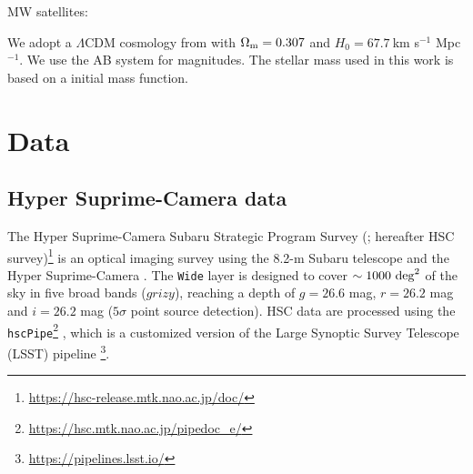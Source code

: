 \documentclass[twocolumn,astrosymb,twocolappendix]{aastex631}
\newcommand{\code}[1]{\texttt{#1}}
\begin{document}
\begin{CJK*}{UTF8}{gbsn}

MW satellites: \citep{Nashimoto2022}


We adopt a $\Lambda$CDM cosmology from \citet{Planck15} with $\Omega_{\rm m}= 0.307$ and $H_0 = 67.7\ $km s$^{-1}$ Mpc$^{-1}$. We use the AB system \citep{Oke1983} for magnitudes. The stellar mass used in this work is based on a \citet{Chabrier2003} initial mass function.

\section{Data} \label{sec:data}
\subsection{Hyper Suprime-Camera data}
The Hyper Suprime-Camera Subaru Strategic Program Survey (\citealt{Aihara2018}; hereafter HSC survey)\footnote{\url{https://hsc-release.mtk.nao.ac.jp/doc/}} is an optical imaging survey using the 8.2-m Subaru telescope and the Hyper Suprime-Camera \citep{Miyazaki2012, Miyazaki2018}. The \texttt{Wide} layer is designed to cover $\sim 1000\ \rm{deg}^{2}$ of the sky in five broad bands ($grizy$), reaching a depth of $g=26.6$ mag, $r=26.2$ mag and $i=26.2$ mag ($5\sigma$ point source detection). HSC data are processed using the \code{hscPipe}\footnote{\url{https://hsc.mtk.nao.ac.jp/pipedoc_e/}} \citep{Bosch2018}, which is a customized version of the Large Synoptic Survey Telescope (LSST) pipeline \citep{LSST-pipeline}\footnote{\url{https://pipelines.lsst.io/}}. 


\end{CJK*}
\end{document}
